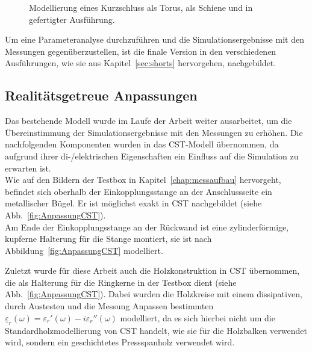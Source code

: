             \begin{figure}[htb]
                \centering
                \hspace{0.01\textwidth}
                \hspace{0.01\textwidth}
                \caption{Modellierung eines Kurzschluss \protect{} als Torus, \protect{} als Schiene und \protect{} in gefertigter Ausführung.}
                \label{fig:KSCST}
            \end{figure}
        
        Um eine Parameteranalyse durchzuführen und die Simulationsergebnisse mit den Messungen gegenüberzustellen, ist die finale Version in den verschiedenen Ausführungen, wie sie aus Kapitel~\ref{sec:shorts} hervorgehen, nachgebildet.
        
        \subsection{Realitätsgetreue Anpassungen}
        Das bestehende Modell wurde im Laufe der Arbeit weiter ausarbeitet, um die Übereinstimmung der Simulationsergebnisse mit den Messungen zu erhöhen. Die nachfolgenden Komponenten wurden in das CST-Modell übernommen, da aufgrund ihrer di-/elektrischen Eigenschaften ein Einfluss auf die Simulation zu erwarten ist.\\
        Wie auf den Bildern der Testbox in Kapitel~\ref{chap:messaufbau} hervorgeht, befindet sich oberhalb der Einkopplungsstange an der Anschlussseite ein metallischer Bügel. Er ist möglichst exakt in CST nachgebildet (siehe Abb.~\ref{fig:AnpassungCST}).\\
        Am Ende der Einkopplungsstange an der Rückwand ist eine zylinderförmige, kupferne Halterung für die Stange montiert, sie ist nach Abbildung~\ref{fig:AnpassungCST} modelliert.
        \par
        Zuletzt wurde für diese Arbeit auch die Holzkonstruktion in CST übernommen, die als Halterung für die Ringkerne in der Testbox dient (siehe Abb.~\ref{fig:AnpassungCST}). Dabei wurden die Holzkreise mit einem dissipativen, durch Austesten und die Messung Anpassen bestimmten $\underline{\varepsilon}_r(\omega) = \varepsilon_r'(\omega)-i\varepsilon_r''(\omega)$ modelliert, da es sich hierbei nicht um die Standardholzmodellierung von CST handelt, wie sie für die Holzbalken verwendet wird, sondern ein geschichtetes Pressspanholz verwendet wird.
        
